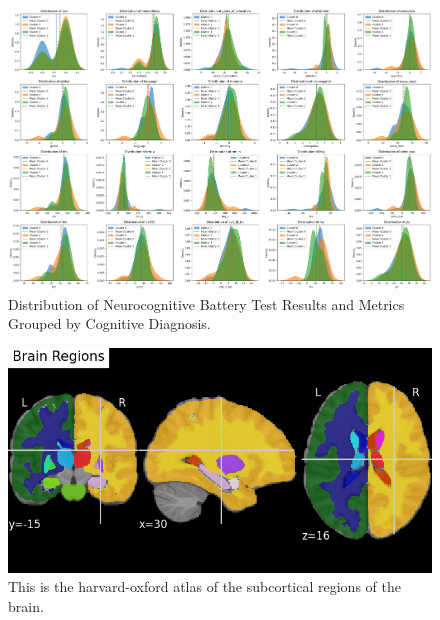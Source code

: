 \documentclass[12pt]{article}
\begin{document}
\begin{figure}[h]  %
    \centering
    \includegraphics[width=\textwidth]{"../img/pdf_of_clustered_test_results.png"}  %
    \caption{Distribution of Neurocognitive Battery Test Results and Metrics Grouped by Cognitive Diagnosis.}
    \label{fig:pdf}  %
\end{figure}

\begin{figure}[h]  %
    \centering
    \includegraphics[width=\textwidth]{"../img/regions.png"}  %
    \caption{This is the harvard-oxford atlas of the subcortical regions of the brain.}
    \label{fig:subcortex}  %
\end{figure}
\end{document}
